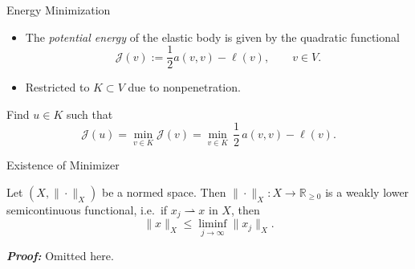 \documentclass[10pt,aspectratio=169]{beamer}
\def\R{{\mathbb R}}
\def\cJ{{\mathcal J}}
\begin{document}
\begin{frame}{Energy Minimization}
	\begin{itemize}
		\item The {\em potential energy} of the elastic body is given by the quadratic functional
		      \begin{equation*}
			      \cJ(v):= \frac{1}{2}a(v,v)-\ell(v),\qquad v\in V.
		      \end{equation*}
		\item Restricted to $K\subset V$ due to nonpenetration.
	\end{itemize}
	\begin{problem}
	Find $u\in K$ such that
	\begin{equation*}
		\cJ(u)=\min_{v\in K}\cJ(v) = \min_{v\in K}\,\frac{1}{2}\,a(v,v)-\ell(v).
	\end{equation*}
	\end{problem}
\end{frame}

\begin{frame}{Existence of Minimizer}
	\begin{lemma}
		Let $(X,\|\cdot\|_X)$ be a normed space. Then $\|\cdot\|_X:X\to \R_{\ge 0}$ is a weakly lower semicontinuous functional, i.e.\ if $x_j\rightharpoonup x$ in $X$, then
		\begin{equation*}
			\|x\|_X \le \liminf_{j\to\infty}\|x_j\|_X.
		\end{equation*}
	\end{lemma}
	\textbf{\em Proof:} Omitted here.
\end{frame}
\end{document}
